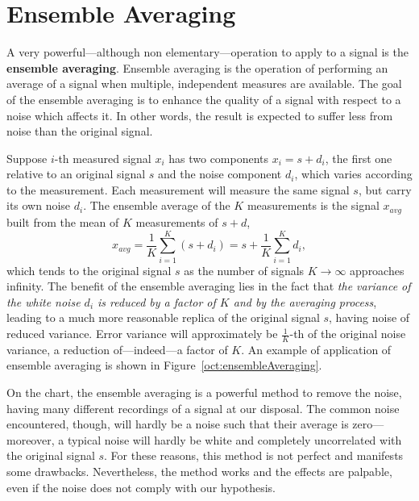 \documentclass[\documentfontsize, twocolumn]{\classname}
\begin{document}
\section{Ensemble Averaging}

A very powerful---although non elementary---operation to apply to a signal is the \textbf{ensemble averaging}. Ensemble averaging is the operation of performing an average of a signal when multiple, independent measures are available. The goal of the ensemble averaging is to enhance the quality of a signal with respect to a noise which affects it. In other words, the result is expected to suffer less from noise than the original signal.

Suppose $i$-th measured signal $x_i$ has two components $x_i = s + d_i$, the
first one relative to an original signal $s$ and the noise component $d_i$, which
varies according to the measurement. Each measurement will measure the same signal $s$, but carry its own noise $d_i$. The ensemble average of the $K$ measurements is the signal $x_{avg}$ built from the mean of $K$ measurements of $s + d$,
\begin{equation}\label{eqn:EnsambleAveraging}
	x_{avg} = \frac{1}{K}\sum_{i=1}^{K} (s + d_i) = s + \frac{1}{K}\sum_{i=1}^{K}d_i,
\end{equation}
which tends to the original signal $s$ as the number of signals $K \rightarrow \infty$ approaches infinity. The benefit of the ensemble averaging lies in the fact that \emph{the variance of the white noise $d_i$ is reduced by a factor of $K$ and by the averaging process}, leading to a much more reasonable replica of the original signal $s$, having noise of reduced variance. Error variance will approximately be $\frac 1 K$-th of the original noise variance, a reduction of---indeed---a factor of $K$. An example of application of ensemble averaging is shown in Figure~\ref{oct:ensembleAveraging}.

On the chart, the ensemble averaging is a powerful method to remove the noise, having many different recordings of a signal at our disposal.
The common noise encountered, though, will hardly be a noise such that their average is zero---moreover, a typical noise will hardly be white and completely uncorrelated with the original signal $s$.
For these reasons, this method is not perfect and manifests some drawbacks. Nevertheless, the method works and the effects are palpable, even if the noise does not comply with our hypothesis.
\end{document}
